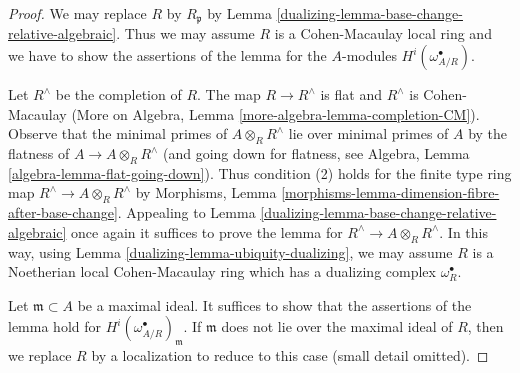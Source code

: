 \begin{proof}

We may replace $R$ by $R_\mathfrak p$ by
Lemma \ref{dualizing-lemma-base-change-relative-algebraic}.
Thus we may assume $R$ is a Cohen-Macaulay local ring
and we have to show the assertions of the lemma
for the $A$-modules $H^i(\omega_{A/R}^\bullet)$.

\medskip\noindent
Let $R^\wedge$ be the completion of $R$.
The map $R \to R^\wedge$ is flat and $R^\wedge$ is Cohen-Macaulay
(More on Algebra, Lemma \ref{more-algebra-lemma-completion-CM}).
Observe that the minimal primes of $A \otimes_R R^\wedge$
lie over minimal primes of $A$ by the flatness of
$A \to A \otimes_R R^\wedge$ (and going down for flatness, see
Algebra, Lemma \ref{algebra-lemma-flat-going-down}).
Thus condition (2) holds for the finite type ring map
$R^\wedge \to A \otimes_R R^\wedge$ by
Morphisms, Lemma \ref{morphisms-lemma-dimension-fibre-after-base-change}.
Appealing to Lemma \ref{dualizing-lemma-base-change-relative-algebraic}
once again it suffices to prove the lemma for
$R^\wedge \to A \otimes_R R^\wedge$. In this way, using
Lemma \ref{dualizing-lemma-ubiquity-dualizing},
we may assume $R$ is a Noetherian local
Cohen-Macaulay ring which has a dualizing complex $\omega_R^\bullet$.

\medskip\noindent
Let $\mathfrak m \subset A$ be a maximal ideal.
It suffices to show that the assertions of
the lemma hold for $H^i(\omega_{A/R}^\bullet)_\mathfrak m$.
If $\mathfrak m$ does not lie over the maximal ideal of $R$,
then we replace $R$ by a localization to reduce to this case
(small detail omitted).


\end{proof}

